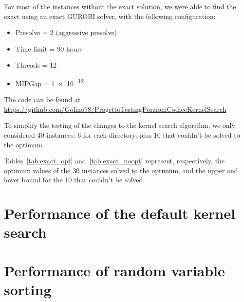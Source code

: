 For most of the instances without the exact solution, we were able to
find the exact using an exact GUROBI solver, with the following configuration:
\begin{itemize}
    \item Presolve = 2 (aggressive presolve)
    \item Time limit = 90 hours
    \item Threads = 12
    \item MIPGap = \num{1e-12}
\end{itemize}

The code can be found at \url{https://github.com/Golino98/ProgettoTestingPorzioniCodiceKernelSearch}

To simplify the testing of the changes to the kernel search algorithm,
we only considered 40 instances: 6 for each directory,
plus 10 that couldn't be solved to the optimum.

Tables~\ref{tab:exact_opt} and~\ref{tab:exact_noopt} represent,
respectively, the optimum values of the 30 instances solved to
the optimum, and the upper and lower bound for the 10
that couldn't be solved.





\section{Performance of the default kernel search}


\section{Performance of random variable sorting}
